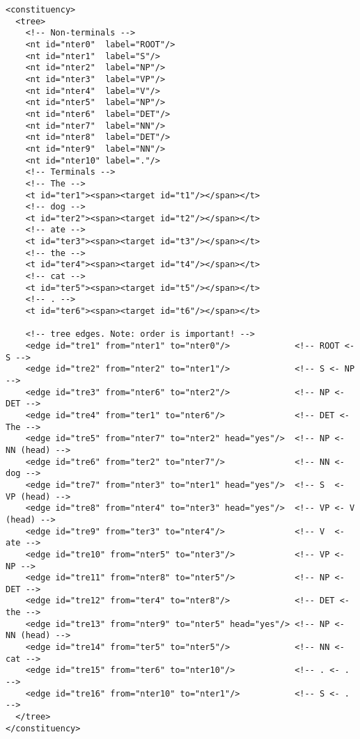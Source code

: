 \begin{Verbatim}[fontsize=\small]
<constituency>
  <tree>
    <!-- Non-terminals -->
    <nt id="nter0"  label="ROOT"/>
    <nt id="nter1"  label="S"/>
    <nt id="nter2"  label="NP"/>
    <nt id="nter3"  label="VP"/>
    <nt id="nter4"  label="V"/>
    <nt id="nter5"  label="NP"/>
    <nt id="nter6"  label="DET"/>
    <nt id="nter7"  label="NN"/>
    <nt id="nter8"  label="DET"/>
    <nt id="nter9"  label="NN"/>
    <nt id="nter10" label="."/>
    <!-- Terminals -->
    <!-- The -->
    <t id="ter1"><span><target id="t1"/></span></t>
    <!-- dog -->
    <t id="ter2"><span><target id="t2"/></span></t>
    <!-- ate -->
    <t id="ter3"><span><target id="t3"/></span></t>
    <!-- the -->
    <t id="ter4"><span><target id="t4"/></span></t>
    <!-- cat -->
    <t id="ter5"><span><target id="t5"/></span></t>
    <!-- . -->
    <t id="ter6"><span><target id="t6"/></span></t>

    <!-- tree edges. Note: order is important! -->
    <edge id="tre1" from="nter1" to="nter0"/>             <!-- ROOT <- S -->
    <edge id="tre2" from="nter2" to="nter1"/>             <!-- S <- NP -->
    <edge id="tre3" from="nter6" to="nter2"/>             <!-- NP <- DET -->
    <edge id="tre4" from="ter1" to="nter6"/>              <!-- DET <- The -->
    <edge id="tre5" from="nter7" to="nter2" head="yes"/>  <!-- NP <- NN (head) -->
    <edge id="tre6" from="ter2" to="nter7"/>              <!-- NN <- dog -->
    <edge id="tre7" from="nter3" to="nter1" head="yes"/>  <!-- S  <- VP (head) -->
    <edge id="tre8" from="nter4" to="nter3" head="yes"/>  <!-- VP <- V (head) -->
    <edge id="tre9" from="ter3" to="nter4"/>              <!-- V  <- ate -->
    <edge id="tre10" from="nter5" to="nter3"/>            <!-- VP <- NP -->
    <edge id="tre11" from="nter8" to="nter5"/>            <!-- NP <- DET -->
    <edge id="tre12" from="ter4" to="nter8"/>             <!-- DET <- the -->
    <edge id="tre13" from="nter9" to="nter5" head="yes"/> <!-- NP <- NN (head) -->
    <edge id="tre14" from="ter5" to="nter5"/>             <!-- NN <- cat -->
    <edge id="tre15" from="ter6" to="nter10"/>            <!-- . <- . -->
    <edge id="tre16" from="nter10" to="nter1"/>           <!-- S <- . -->
  </tree>
</constituency>
\end{Verbatim}



